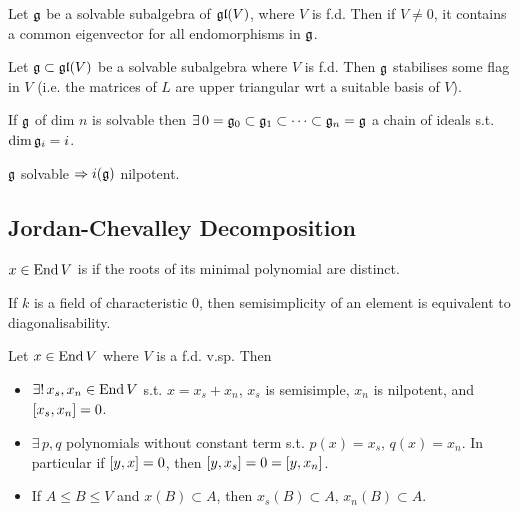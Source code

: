 \documentclass{article}
\begin{document}
\begin{theorem}
	Let $\mf{g}$ be a solvable subalgebra of $\mf{gl}(V)$, where $V$ is f.d. Then if $V \neq 0$, it contains a common eigenvector for all endomorphisms in $\mf{g}$. 
\end{theorem}
\begin{corollary}
	Let $\mf{g}\subset \mf{gl}(V)$ be a solvable subalgebra where $V$ is f.d. Then $\mf{g}$ stabilises some flag in $V$ (i.e. the matrices of $L$ are upper triangular wrt a suitable basis of $V$). 
\end{corollary}

\begin{corollary}
	If $\mf{g}$ of dim $n$ is solvable then $\exists \,  0 = \mf{g}_0 \subset \mf{g}_1 \subset \dots \subset \mf{g}_n=\mf{g}$ a chain of ideals s.t. $\dim \mf{g}_i = i$. 
\end{corollary}

\begin{corollary}
	$\mf{g}$ solvable $\Rightarrow i(\mf{g})$ nilpotent. 
\end{corollary}

\subsection{Jordan-Chevalley Decomposition}
\begin{definition}
$x \in \End V$ is  if the roots of its minimal polynomial are distinct. 
\end{definition}

\begin{remark}
	If $k$ is a field of characteristic 0, then semisimplicity of an element is equivalent to diagonalisability. 
\end{remark}

\begin{prop}
	Let $x \in \End V$ where $V$ is a f.d. v.sp. Then 
	\begin{itemize}
		\item $\exists ! \,  x_s,  x_n \in \End V$ s.t. $x=x_s+x_n$, $x_s$ is semisimple, $x_n$ is nilpotent, and $\comm[x_s]{x_n}=0$. 
		\item $\exists \, p,q$ polynomials without constant term s.t. $p(x) = x_s, \, q(x) = x_n$. In particular if $\comm[y]{x}=0$, then $\comm[y]{x_s} = 0 = \comm[y]{x_n}$. 
		\item If $A \leq B \leq V$ and $x(B)\subset A$, then $x_s(B)\subset A, \, x_n(B) \subset A$. 
	\end{itemize}
\end{prop}
\end{document}
